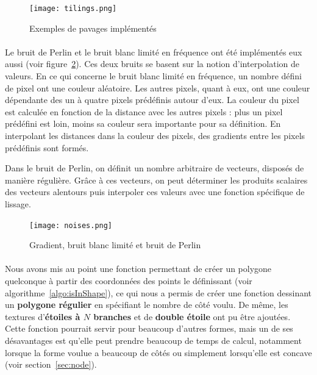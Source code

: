\documentclass[a4paper]{article}
\begin{document}
\begin{figure}
    \centering
    \texttt{[image: tilings.png]}
    \caption{Exemples de pavages implémentés}
    \label{fig:tilings}
\end{figure}

\paragraph{}
Le bruit de Perlin et le bruit blanc limité en fréquence ont été implémentés eux aussi (voir figure~\ref{fig:noises}). Ces deux bruits se basent sur la notion d'interpolation de valeurs. En ce qui concerne le bruit blanc limité en fréquence, un nombre défini de pixel ont une couleur aléatoire. Les autres pixels, quant à eux, ont une couleur dépendante des un à quatre pixels prédéfinis autour d'eux. La couleur du pixel est calculée en fonction de la distance avec les autres pixels : plus un pixel prédéfini est loin, moins sa couleur sera importante pour sa définition. En interpolant les distances dans la couleur des pixels, des gradients entre les pixels prédéfinis sont formés.

Dans le bruit de Perlin, on définit un nombre arbitraire de vecteurs, disposés de manière régulière. Grâce à ces vecteurs, on peut déterminer les produits scalaires des vecteurs alentours puis interpoler ces valeurs avec une fonction spécifique de lissage.


\begin{figure}
    \centering
    \texttt{[image: noises.png]}
    \caption{Gradient, bruit blanc limité et bruit de Perlin}
    \label{fig:noises}
\end{figure}

\paragraph{}
Nous avons mis au point une fonction permettant de créer un polygone quelconque à partir des coordonnées des points le définissant (voir algorithme~\ref{algo:isInShape}), ce qui nous a permis de créer une fonction dessinant un \textbf{polygone régulier} en spécifiant le nombre de côté voulu. De même, les textures d'\textbf{étoiles à $N$ branches} et de \textbf{double étoile} ont pu être ajoutées. Cette fonction pourrait servir pour beaucoup d'autres formes, mais un de ses désavantages est qu'elle peut prendre beaucoup de temps de calcul, notamment lorsque la forme voulue a beaucoup de côtés ou simplement lorsqu'elle est concave (voir section~\ref{sec:node}). 
\end{document}
